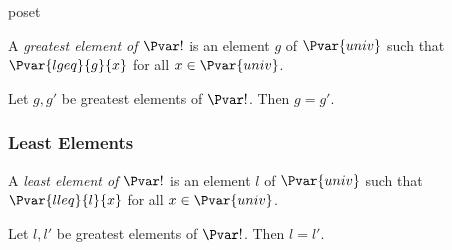 \documentclass{stex}
\begin{document}
\begin{smodule}{poset}
  \begin{forthel}
    \begin{definition}
      A \emph{greatest element of $\Pvar!$} is an element $g$ of $\Pvar{univ}$ such that $\Pvar{lgeq}{g}{x}$ for all $x\in\Pvar{univ}$.
    \end{definition}

    \begin{proposition}
      Let $g,g'$ be greatest elements of $\Pvar!$.
      Then $g=g'$.
    \end{proposition}
  \end{forthel}

  \subsubsection{Least Elements}

  \begin{forthel}
    \begin{definition}
      A \emph{least element of $\Pvar!$} is an element $l$ of $\Pvar{univ}$ such that $\Pvar{lleq}{l}{x}$ for all $x\in\Pvar{univ}$.
    \end{definition}

    \begin{proposition}
      Let $l,l'$ be greatest elements of $\Pvar!$.
      Then $l=l'$.
    \end{proposition}
  \end{forthel}
\end{smodule}
\end{document}
